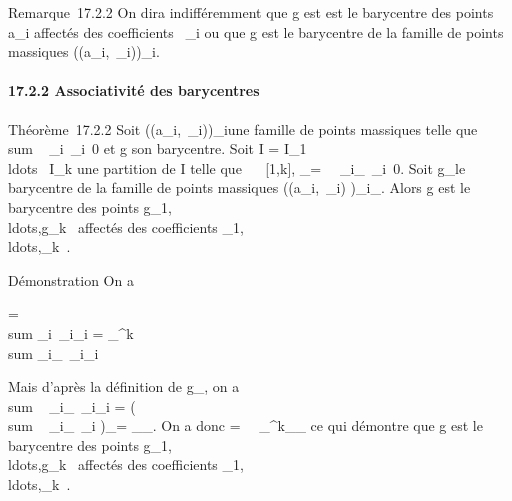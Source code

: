 \documentclass[]{article}
\begin{document}
Remarque~17.2.2 On dira indifféremment que g est est le barycentre des
points a\_i affectés des coefficients \lambda~\_i ou que g est
le barycentre de la famille de points massiques \left
((a\_i,\lambda~\_i)\right )\_i\inI.

\paragraph{17.2.2 Associativité des barycentres}

Théorème~17.2.2 Soit \left
((a\_i,\lambda~\_i)\right )\_i\inI une
famille de points massiques telle que
\\sum ~
\_i\inI\lambda~\_i\neq~0 et g son
barycentre. Soit I = I\_1
\cup\\ldots~ \cup
I\_k une partition de I telle que \forall~~\jmath \in
{[}1,k{]}, \mu\_\jmath =\
\sum ~
\_i\inI\_\jmath\lambda~\_i\neq~0. Soit
g\_\jmath le barycentre de la famille de points massiques
\left ((a\_i,\lambda~\_i)\right
)\_i\inI\_\jmath. Alors g est le barycentre des points
g\_1,\\ldots,g\_k~
affectés des coefficients
\mu\_1,\\ldots,\mu\_k~.

Démonstration On a

 = \\sum
\_i\inI\lambda~\_i\overrightarrowga\_i
= \sum \_^k~
\\sum
\_i\inI\_\jmath\lambda~\_i\overrightarrowga\_i

Mais d'après la définition de g\_\jmath, on a
\\sum ~
\_i\inI\_\jmath\lambda~\_i\overrightarrowga\_i
= \left
(\\sum ~
\_i\inI\_\jmath\lambda~\_i\right
)\overrightarrowgg\_\jmath =
\mu\_\jmath\overrightarrowgg\_\jmath. On a donc
 =\
\sum ~
\_^k\mu\_\jmath\overrightarrowgg\_\jmath
ce qui démontre que g est le barycentre des points
g\_1,\\ldots,g\_k~
affectés des coefficients
\mu\_1,\\ldots,\mu\_k~.
\end{document}
